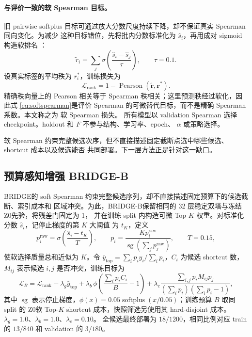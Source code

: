 \documentclass[UTF8,a4paper,10pt,twocolumn]{ctexart}
\newcommand{\zmethod}{Z0}
\newcommand{\gmethod}{BRIDGE}
\newcommand{\bmethod}{BRIDGE-B}
\begin{document}
\paragraph{与评价一致的软 Spearman 目标。}

旧 pairwise softplus 目标可通过放大分数尺度持续下降，却不保证真实 Spearman 同向变化。为减少
这种目标错位，先将批内分数标准化为 $\hat{s}_i$，再用成对 sigmoid 构造软排名
\citep{jagerman2022rax}：
\begin{equation}
  \widetilde r_i=\sum_j \sigma\!\left(\frac{\hat{s}_i-\hat{s}_j}{\tau}\right),
  \qquad \tau=0.1.
\end{equation}
设真实标签的平均秩为 $r_i^*$，训练损失为
\begin{equation}
  \mathcal{L}_{\mathrm{rank}}=1-\operatorname{Pearson}
  (\widetilde{\bm r},\bm r^*).
  \label{eq:softspearman}
\end{equation}
精确秩向量上的 Pearson 相关等于 Spearman 秩相关；这里预测秩经过软化，因此式
\eqref{eq:softspearman}是评价 Spearman 的可微替代目标，而不是精确 Spearman 系数。本文称之为
软 Spearman 损失。
所有模型以 validation Spearman 选择 checkpoint。holdout 和 $F$ 不参与结构、学习率、epoch、
$\alpha$ 或策略选择。

软 Spearman 约束完整候选次序，但不直接描述固定截断点选中哪些候选、shortcut 成本以及候选能否
共同部署。下一层方法正是针对这一缺口。

\subsection{预算感知增强 \bmethod}

\gmethod 的 soft Spearman 约束完整候选序列，却不直接描述固定预算下的候选截断、索引成本和
区域冲突。为此，\bmethod 保留相同的 32 层稳定双塔与冻结 \zmethod 先验，将残差门固定为 1，
并在训练 split 内构造可微 Top-$K$ 权重。对标准化分数 $\hat{s}_i$，记停止梯度的第 $K$ 大阈值
为 $t_K$，定义
\begin{equation}
  p_i^{\mathrm{raw}}=\sigma\!\left(\frac{\hat{s}_i-t_K}{T}\right),\qquad
  p_i=\frac{Kp_i^{\mathrm{raw}}}{\operatorname{sg}(\sum_j p_j^{\mathrm{raw}})},\qquad T=0.15,
  \label{eq:softtopk}
\end{equation}
使软选择质量总和近似为 $K$。令 $\bar y_{\mathrm{top}}=\sum_i p_i y_i/\sum_i p_i$，$C_i$
为候选 shortcut 数，$M_{ij}$ 表示候选 $i,j$ 是否冲突，训练目标为
\begin{equation}
  \mathcal L_B=\mathcal L_{\mathrm{rank}}
  -\lambda_g\bar y_{\mathrm{top}}
  +\lambda_b\,\phi\!\left(\frac{\sum_i p_iC_i}{B}-1\right)
  +\lambda_c\frac{\sum_{i,j}p_iM_{ij}p_j}{(\sum_i p_i)(\sum_i p_i-1)},
  \label{eq:bridgeb}
\end{equation}
其中 $\operatorname{sg}$ 表示停止梯度，$\phi(x)=0.05\operatorname{softplus}(x/0.05)$；训练预算
$B$ 取同 split 的 \zmethod 软 Top-$K$ shortcut 成本，快照筛选另使用其 hard-disjoint 成本。
$\lambda_g=1.0$、$\lambda_b=1.0$、$\lambda_c=0.10$。
全候选最终部署为 $18/1200$，相同比例对应 train 的 $13/840$ 和 validation 的 $3/180$。
\end{document}
